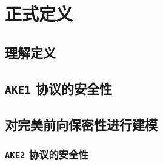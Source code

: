 \section{正式定义}\label{sec:21-9}

\begin{definition}[静态安全的认证密钥交换]\label{def:21-1}
	
\end{definition}

\begin{remark}\label{remark:21-1}
	
\end{remark}

\begin{remark}\label{remark:21-2}
	
\end{remark}

\subsection{理解定义}\label{subsec:21-9-1}

\subsection{\texttt{AKE1} 协议的安全性}\label{subsec:21-9-2}

\begin{theorem}\label{theo:21-1}
	
\end{theorem}

\subsection{对完美前向保密性进行建模}\label{subsec:21-9-3}

\begin{definition}\label{def:21-2}
	
\end{definition}

\begin{remark}\label{remark:21-3}
	
\end{remark}

\begin{remark}\label{remark:21-4}
	
\end{remark}

\subsubsection{\texttt{AKE2} 协议的安全性}\label{subsubsec:21-9-3-1}

